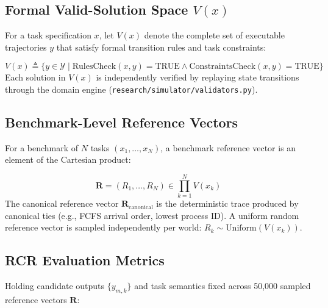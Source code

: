 \documentclass[11pt]{article}
\begin{document}
\subsection{Formal Valid-Solution Space $V(x)$}
For a task specification $x$, let $V(x)$ denote the complete set of executable trajectories $y$ that satisfy formal transition rules and task constraints:

\[V(x) \triangleq \{ y \in \mathcal{Y} \mid \text{RulesCheck}(x, y) = \text{TRUE} \land \text{ConstraintsCheck}(x, y) = \text{TRUE} \}\]
Each solution in $V(x)$ is independently verified by replaying state transitions through the domain engine (\texttt{research/simulator/validators.py}).

\subsection{Benchmark-Level Reference Vectors}
For a benchmark of $N$ tasks $(x_1, \dots, x_N)$, a benchmark reference vector is an element of the Cartesian product:

\[\mathbf{R} = (R_1, \dots, R_N) \in \prod_{k=1}^N V(x_k)\]
The canonical reference vector $\mathbf{R}_{\text{canonical}}$ is the deterministic trace produced by canonical ties (e.g., FCFS arrival order, lowest process ID). A uniform random reference vector is sampled independently per world: $R_k \sim \text{Uniform}(V(x_k))$.

\subsection{RCR Evaluation Metrics}
Holding candidate outputs $\{y_{m,k}\}$ and task semantics fixed across 50,000 sampled reference vectors $\mathbf{R}$:
\end{document}
